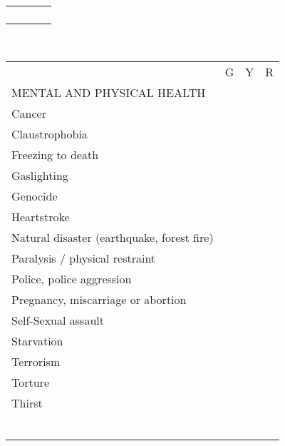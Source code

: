 \documentclass[11pt,twoside,a4paper]{article}
\begin{document}
\begin{multicols}{2}
\begin{tabular}{ p{} c c c}
		\hrulefill			&		&		&		\\
		\hrulefill			&		&		&		\\
		\hrulefill			&		&		&		\\
							&		&		&		\\
		
	\end{tabular}
		
		\vfill~\\ \columnbreak
	
	\begin{tabular}{ p{} c c c}
		
												&	G	&	Y	&	R	\\
												
		MENTAL AND PHYSICAL HEALTH \dotfill							&		&		&		\\
		Cancer \dotfill												&		&		&		\\
		Claustrophobia \dotfill										&		&		&		\\
		Freezing to death \dotfill									&		&		&		\\
		Gaslighting \dotfill										&		&		&		\\
		Genocide \dotfill											&		&		&		\\
		Heartstroke \dotfill										&		&		&		\\
		Natural disaster (earthquake, forest fire) \dotfill			&		&		&		\\
		Paralysis / physical restraint \dotfill						&		&		&		\\
		Police, police aggression \dotfill							&		&		&		\\
		Pregnancy, miscarriage or abortion \dotfill					&		&		&		\\
		Self-Sexual assault \dotfill								&		&		&		\\
		Starvation \dotfill											&		&		&		\\
		Terrorism \dotfill											&		&		&		\\
		Torture \dotfill											&		&		&		\\
		Thirst \dotfill												&		&		&		\\
		
		\hrulefill			&		&		&		\\
		\hrulefill			&		&		&		\\
		\hrulefill			&		&		&		\\
		\hrulefill			&		&		&		\\
		\hrulefill			&		&		&		\\
							&		&		&		\\
		

\end{tabular}
\end{multicols}
\end{document}
